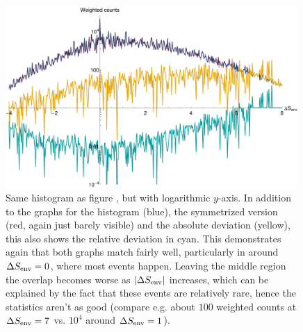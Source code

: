 \begin{figure}[htbp]
	\centering
	\includegraphics[width=30em]{figures/histogram_log}
	\caption[]{Same histogram as figure , but with logarithmic \(y\)-axis. In addition to the graphs for the histogram ({\color{blue}blue}), the symmetrized version ({\color{red}red}, again just barely visible) and the absolute deviation ({\color{yellow}yellow}), this also shows the relative deviation in {\color{cyan}cyan}. This demonstrates again that both graphs match fairly well, particularly in around \(\Delta S_\text{env} = 0\), where most events happen. Leaving the middle region the overlap becomes worse as \(|\Delta S_\text{env}|\) increases, which can be explained by the fact that these events are relatively rare, hence the statistics aren't as good (compare e.g. about \(100\) weighted counts at \(\Delta S_\text{env} = 7\) vs. \(10^4\) around \(\Delta S_\text{env} = 1\)).}
	\label{fig:histogram_log}
\end{figure}